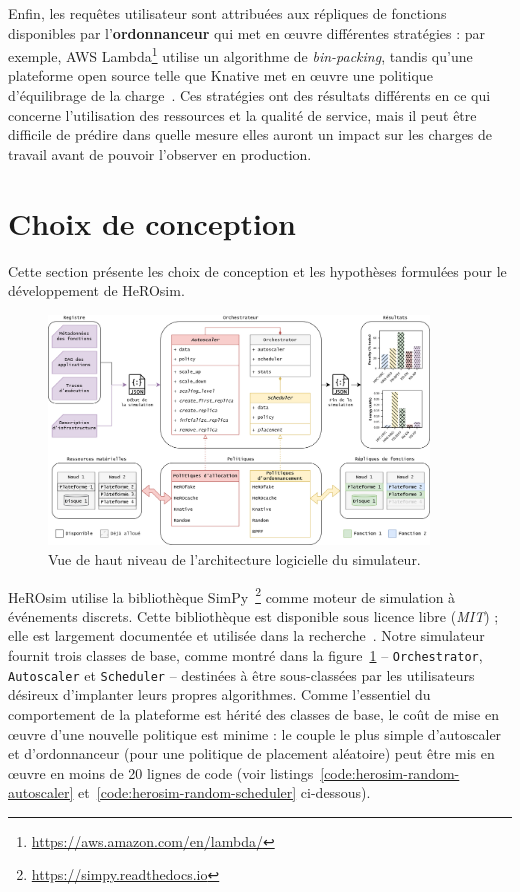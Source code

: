 Enfin, les requêtes utilisateur sont attribuées aux répliques de fonctions disponibles par l'\textbf{ordonnanceur} qui met en œuvre différentes stratégies : par exemple, \gls{AWS} Lambda\footnote{\href{https://aws.amazon.com/en/lambda/}{https://aws.amazon.com/en/lambda/}} utilise un algorithme de \textit{bin-packing}, tandis qu'une plateforme open source telle que Knative met en œuvre une politique d'équilibrage de la charge~\cite{Lannurien2023}. Ces stratégies ont des résultats différents en ce qui concerne l'utilisation des ressources et la qualité de service, mais il peut être difficile de prédire dans quelle mesure elles auront un impact sur les charges de travail avant de pouvoir l'observer en production.

\section{Choix de conception}
\label{section:herosim-herosim}

Cette section présente les choix de conception et les hypothèses formulées pour le développement de HeROsim.

\begin{figure}[!ht]
    \centering
    \includegraphics[width=0.9\textwidth]{6_Chapitre6/figures/software-architecture.png}
    \caption{Vue de haut niveau de l'architecture logicielle du simulateur.}
\label{figure:herosim-software-architecture}
\end{figure}

HeROsim utilise la bibliothèque SimPy~\footnote{\href{https://simpy.readthedocs.io}{https://simpy.readthedocs.io}} comme moteur de simulation à événements discrets. Cette bibliothèque est disponible sous licence libre (\textit{MIT}) ; elle est largement documentée et utilisée dans la recherche~\cite{matloffIntroductionDiscreteEventSimulation, zinovievDiscreteEventSimulation2024a}. Notre simulateur fournit trois classes de base, comme montré dans la figure~\ref{figure:herosim-software-architecture} -- \texttt{Orchestrator}, \texttt{Autoscaler} et \texttt{Scheduler} -- destinées à être sous-classées par les utilisateurs désireux d'implanter leurs propres algorithmes. Comme l'essentiel du comportement de la plateforme est hérité des classes de base, le coût de mise en œuvre d'une nouvelle politique est minime : le couple le plus simple d'autoscaler et d'ordonnanceur (pour une politique de placement aléatoire) peut être mis en œuvre en moins de 20 lignes de code (voir listings~\ref{code:herosim-random-autoscaler} et~\ref{code:herosim-random-scheduler} ci-dessous).

